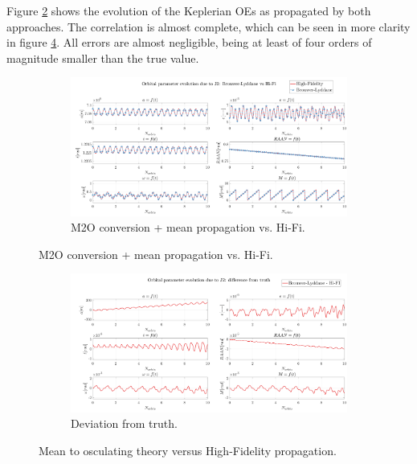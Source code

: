 		\indent Figure \ref{figCh4:M20_vs_HiFi} shows the evolution of the Keplerian OEs as propagated by both approaches. The correlation is almost complete, which can be seen in more clarity in figure \ref{figCh4:diff_truth}. All errors are almost negligible, being at least of four orders of magnitude smaller than the true value.
		\begin{figure}[ht]
		\begin{changemargin}{-2.5cm}{-0.5cm}
		\begin{adjustbox}{width=1.2\textwidth}
		\centering
		\medskip
		\begin{subfigure}[t]{\linewidth}
		\centering\includegraphics[width=\linewidth]{Chapters/Chapter_04/High_quality/_due_to_J2__Brouwer_Lyddane_vs_Hi_Fi}
		\caption{M2O conversion + mean propagation vs. Hi-Fi.}
		\label{figCh4:M20_vs_HiFi}
		\end{subfigure}
		\end{adjustbox}
		\end{changemargin}
		\end{figure}
		\begin{figure}
		\centering
		\begin{changemargin}{-2.5cm}{-0.5cm}
		\begin{adjustbox}{width=1.2\textwidth}
		\ContinuedFloat
		\begin{subfigure}[t]{\linewidth}
		\centering\includegraphics[width=\linewidth]{Chapters/Chapter_04/High_quality/_due_to_J2__difference_from_truth}
		\caption{Deviation from truth.}
		\label{figCh4:diff_truth}
		\end{subfigure}
		\end{adjustbox}
		\end{changemargin}
		\caption{Mean to osculating theory versus High-Fidelity propagation.}
		\end{figure}
		\FloatBarrier
